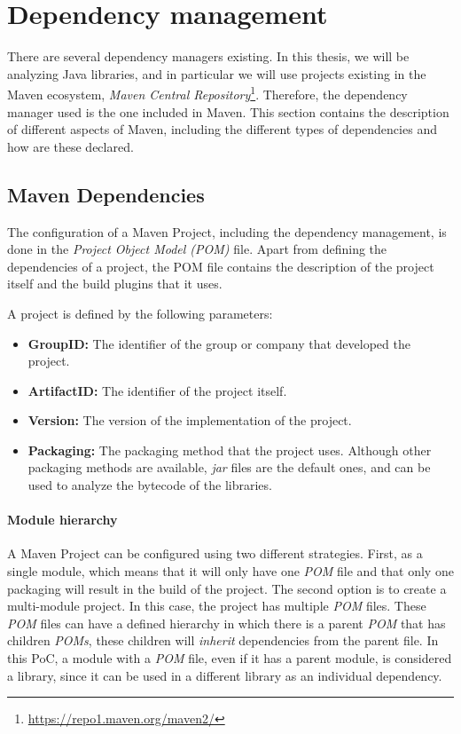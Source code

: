 \section{Dependency management}
There are several dependency managers existing. In this thesis, we will be analyzing Java libraries, and in particular we will use projects existing in the Maven ecosystem, \textit{Maven Central Repository}\footnote{\url{https://repo1.maven.org/maven2/}}. Therefore, the dependency manager used is the one included in Maven. This section contains the description of different aspects of Maven, including the different types of dependencies and how are these declared.

\subsection{Maven Dependencies}
The configuration of a Maven Project, including the dependency management, is done in the \textit{Project Object Model (POM)} file. Apart from defining the dependencies of a project, the POM file contains the description of the project itself and the build plugins that it uses.

A project is defined by the following parameters:

\begin{itemize}
  \item \textbf{GroupID:} The identifier of the group or company that developed the project.
  \item \textbf{ArtifactID:} The identifier of the project itself.
  \item \textbf{Version:} The version of the implementation of the project.
  \item \textbf{Packaging:} The packaging method that the project uses. Although other packaging methods are available, \textit{jar} files are the default ones, and can be used to analyze the bytecode of the libraries.
\end{itemize}

\paragraph{Module hierarchy}
A Maven Project can be configured using two different strategies. First, as a single module, which means that it will only have one \textit{POM} file and that only one packaging will result in the build of the project. The second option is to create a multi-module project. In this case, the project has multiple \textit{POM} files. These \textit{POM} files can have a defined hierarchy in which there is a parent \textit{POM} that has children \textit{POMs}, these children will \textit{inherit} dependencies from the parent file. In this PoC, a module with a \textit{POM} file, even if it has a parent module, is considered a library, since it can be used in a different library as an individual dependency.

